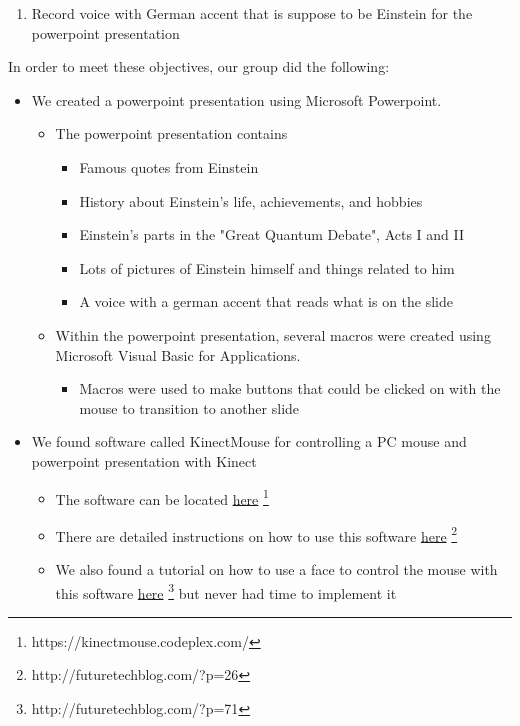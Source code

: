 \documentclass[12pt]{article}
\begin{document}
\begin{description}
\begin{enumerate}
			\item Record voice with German accent that is suppose to be Einstein for the powerpoint presentation
		\end{enumerate}
		In order to meet these objectives, our group did the following:
		\begin{itemize}
			\item We created a powerpoint presentation using Microsoft Powerpoint.
				\begin{itemize}
					\item The powerpoint presentation contains
						\begin{itemize}
							\item Famous quotes from Einstein
							\item History about Einstein's life, achievements, and hobbies
							\item Einstein's parts in the "Great Quantum Debate", Acts I and II
							\item Lots of pictures of Einstein himself and things related to him
							\item A voice with a german accent that reads what is on the slide
						\end{itemize}
					\item Within the powerpoint presentation, several macros were created using Microsoft Visual Basic for Applications.
						\begin{itemize}
							\item Macros were used to make buttons that could be clicked on with the mouse to transition to another slide
						\end{itemize}
				\end{itemize}
			\newpage
			\item We found software called KinectMouse for controlling a PC mouse and powerpoint presentation with Kinect
				\begin{itemize}
					\item The software can be located \href{https://kinectmouse.codeplex.com/}{here} \footnote{https://kinectmouse.codeplex.com/}
					\item There are detailed instructions on how to use this software \href{http://futuretechblog.com/?p=26}{here} \footnote{http://futuretechblog.com/?p=26}
					\item We also found a tutorial on how to use a face to control the mouse with this software \href{http://futuretechblog.com/?p=71}{here} \footnote{http://futuretechblog.com/?p=71} but never had time to implement it

\end{itemize}
\end{itemize}
\end{description}
\end{document}
